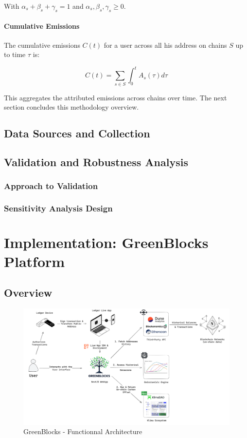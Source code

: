 \documentclass[11pt]{report}
\begin{document}
With $\alpha_{s} + \beta_{s} + \gamma_{s} = 1$ and $\alpha_{s}, \beta_{s}, \gamma_{s} \geq 0$.



\subsubsection*{Cumulative Emissions}

The cumulative emissions $C(t)$ for a user across all his address on chains $S$ up to time $\tau$ is:

\begin{equation}
    C(t) = \sum_{s \in S} \int_{0}^{t} A_s(\tau) d\tau
\end{equation}

This aggregates the attributed emissions across chains over time. The next section concludes this methodology overview.

\section{Data Sources and Collection}
\section{Validation and Robustness Analysis}
\subsection{Approach to Validation}
\subsection{Sensitivity Analysis Design}

\chapter{Implementation: GreenBlocks Platform}
\section{Overview}
\begin{figure}[h!]
    \centering
    \centerline{\includegraphics[scale=0.08]{figures/functionnal architecture.png}}
    \caption{GreenBlocks - Functionnal Architecture}
    \label{fig:functionnal_architecture}
\end{figure}
\end{document}
